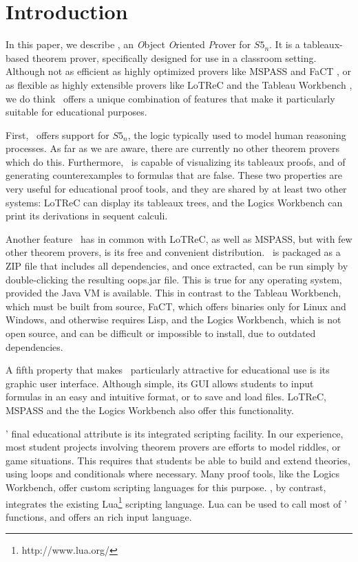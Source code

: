 \section{Introduction}
\label{sec:introduction}

In this paper, we describe \oops, an {\it O}bject {\it O}riented {\it P}rover
for $S5_n$.
It is a tableaux-based theorem prover, specifically designed for use in a
classroom setting.
Although not as efficient as highly optimized provers like MSPASS
\citep{mspass2000} and FaCT \citep{fact1998}, or as flexible as highly
extensible provers like LoTReC \citep{lotrec2005} and the Tableau Workbench
\citep{twb2009}, we do think \oops\ offers a unique combination of features
that make it particularly suitable for educational purposes.

First, \oops\ offers support for $S5_n$, the logic typically used to model
human reasoning processes.
As far as we are aware, there are currently no other theorem provers which do
this.
Furthermore, \oops\ is capable of visualizing its tableaux proofs, and of
generating counterexamples to formulas that are false.
These two properties are very useful for educational proof tools, and they are
shared by at least two other systems: LoTReC can display its tableaux trees,
and the Logics Workbench \citep{heuerding1996} can print its derivations in
sequent calculi.

Another feature \oops\ has in common with LoTReC, as well as MSPASS, but with
few other theorem provers, is its free and convenient distribution.
\oops\ is packaged as a ZIP file that includes all dependencies, and once
extracted, can be run simply by double-clicking the resulting oops.jar file.
This is true for any operating system, provided the Java VM is available.
This in contrast to the Tableau Workbench, which must be built from source,
FaCT, which offers binaries only for Linux and Windows, and otherwise requires
Lisp, and the Logics Workbench, which is not open source, and can be difficult
or impossible to install, due to outdated dependencies.

A fifth property that makes \oops\ particularly attractive for educational use
is its graphic user interface.
Although simple, its GUI allows students to input formulas in an easy and
intuitive format, or to save and load files.
LoTReC, MSPASS and the the Logics Workbench also offer this functionality.

\oops' final educational attribute is its integrated scripting facility.
In our experience, most student projects involving theorem provers are efforts
to model riddles, or game situations.
This requires that students be able to build and extend theories, using loops
and conditionals where necessary.
Many proof tools, like the Logics Workbench, offer custom scripting languages
for this purpose.
\oops, by contrast, integrates the existing Lua\footnote{http://www.lua.org/}
scripting language.
Lua can be used to call most of \oops' functions, and offers an  rich input
language.
 
